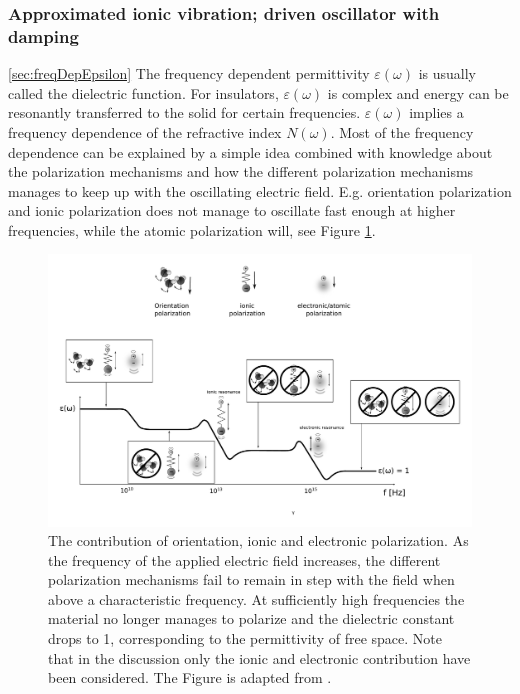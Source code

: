 \subsubsection{Approximated ionic vibration; driven oscillator with damping} \ref{sec:freqDepEpsilon}
The frequency dependent permittivity  $\varepsilon (\omega)$ is usually called the dielectric function.
For insulators, $\varepsilon(\omega)$ is complex and energy can be resonantly transferred to the solid
for certain frequencies. $\varepsilon(\omega)$ implies a frequency dependence of the refractive
index $N(\omega)$. Most of the frequency dependence can be explained by a simple idea 
combined with knowledge about the polarization mechanisms and how the different polarization mechanisms
manages to keep up with the oscillating electric field. E.g. orientation polarization and ionic polarization
does not manage to oscillate fast enough at higher frequencies, while the atomic polarization will, see
Figure \ref{fig:polarizationContribution}.
%
\begin{figure}[h!]
  \centering
   \includegraphics[width=1.0\textwidth]{Figures/polarizationContributionToPermittivity.pdf}
   \caption{ 
      The contribution of orientation, ionic and electronic polarization. As the frequency
      of the applied electric field increases, the different polarization mechanisms fail to remain in 
      step with the field when above a characteristic frequency. At sufficiently high 
      frequencies the material no longer manages to polarize and the dielectric constant drops 
      to 1, corresponding to the permittivity of free space. Note that in the discussion only
      the ionic and electronic contribution have been considered. The Figure is adapted from 
      \cite{cambdridgePermittivityPage}.
   }
   \label{fig:polarizationContribution}
\end{figure}
